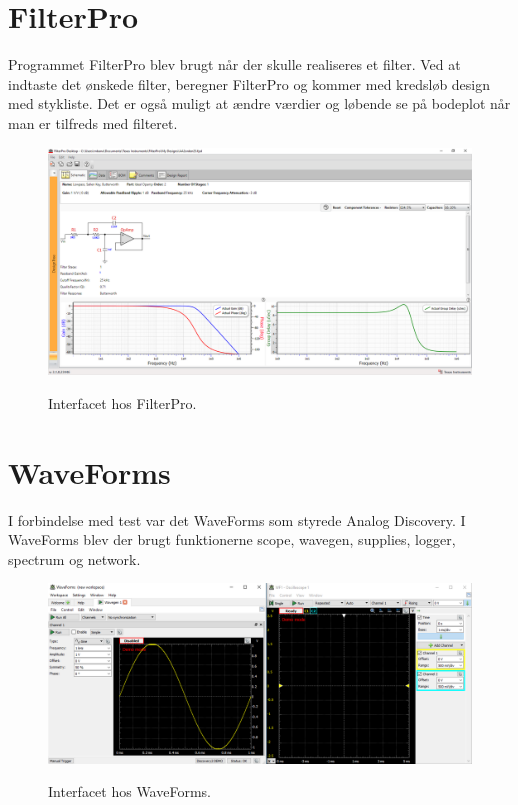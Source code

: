 \section{FilterPro}

Programmet FilterPro blev brugt når der skulle realiseres et filter. Ved at indtaste det ønskede filter, beregner FilterPro og kommer med kredsløb design med stykliste. Det er også muligt at ændre værdier og løbende se på bodeplot når man er tilfreds med filteret. 

\begin{figure}[H]
\centering
{\includegraphics[width=\linewidth]
{Figure/filterpro}}
\caption{Interfacet hos FilterPro.}
\label{filterpro}
\end{figure}


\section{WaveForms}
I forbindelse med test var det WaveForms som styrede Analog Discovery. I WaveForms blev der brugt funktionerne scope, wavegen, supplies, logger, spectrum og network.


\begin{figure}[H]
\centering
{\includegraphics[width=\linewidth]
{Figure/waveformsVaerktoj}}
\caption{Interfacet hos WaveForms.}
\label{waveformsVaerktoj}
\end{figure}


